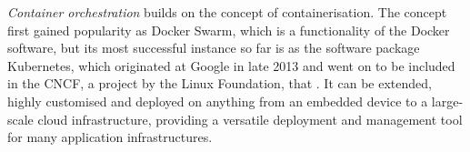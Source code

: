 \emph{Container orchestration} builds on the concept of containerisation.  The concept first gained popularity as Docker Swarm, which is a functionality of the Docker software, but its most successful instance so far is as the software package Kubernetes, which originated at Google in late 2013 \parencite{kubernetesHistory} and went on to be included in the \ac{CNCF}, a project by the Linux Foundation, that . It can be extended, highly customised and deployed on anything from an embedded device to a large-scale cloud infrastructure, providing a versatile deployment and management tool for many application infrastructures.
